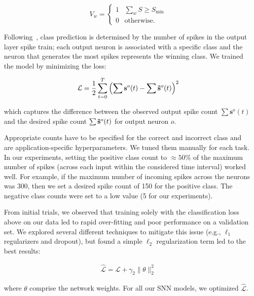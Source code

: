 \documentclass[fyp]{socreport}
\begin{document}
\begin{equation} \label{eqn:bin}
  V_w = \begin{cases}
    1 & \sum_{w} S \ge S_\text{min} \\
    0 & \text{otherwise.}
  \end{cases}
\end{equation}

Following~\cite{NIPS2018_7415}, class prediction is determined by the
number of spikes in the output layer spike train; each output neuron is
associated with a specific class and the neuron that generates the most spikes
represents the winning class. We trained the model by minimizing the loss:

\begin{align}
    \mathcal{L} = \frac{1}{2} \sum_{t=0}^T \left( \sum \mathbf{s}^o(t) - \sum \mathbf{\Tilde{s}}^o(t) \right)^2
\end{align}

which captures the difference between the observed output spike count
$\sum \mathbf{s}^o(t)$ and the desired spike count
$\sum \mathbf{\Tilde{s}}^o(t)$ for output neuron $o$.

Appropriate counts have to be specified for the correct and incorrect class and
are application-specific hyperparameters. We tuned them manually for each task.
In our experiments, setting the positive class count to $\approx 50\%$ of the
maximum number of spikes (across each input within the considered time interval)
worked well. For example, if the maximum number of incoming spikes across the
neurons was 300, then we set a desired spike count of 150 for the positive
class. The negative class counts were set to a low value (5 for our
experiments).

From initial trials, we observed that training solely with the classification
loss above on our data led to rapid over-fitting and poor performance on a
validation set. We explored several different techniques to mitigate this issue
(e.g., $\ell_1$ regularizers and dropout), but found a simple $\ell_2$
regularization term led to the best results:

\begin{align}
    \mathcal{\hat{L}} = \mathcal{L} +  \gamma_2 \| \theta \|^2_2
\end{align}

where $\theta$ comprise the network weights. For all our SNN models, we
optimized $\mathcal{\hat{L}}$.
\end{document}
